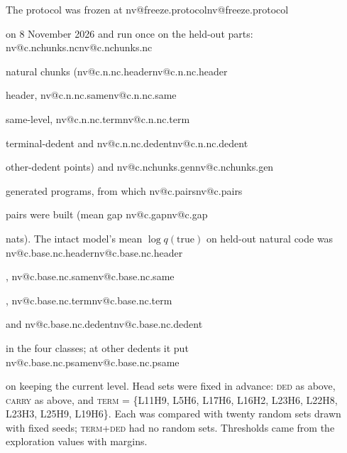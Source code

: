 \documentclass[11pt]{article}
\makeatletter
\newcommand{\nv}[1]{\ifcsname nv@#1\endcsname\csname nv@#1\endcsname\else\PackageError{numbers}{Unknown number key #1}{}\fi}
\newcommand{\hd}[2]{L#1H#2}
\newcommand{\ded}{\textsc{ded}}
\newcommand{\term}{\textsc{term}}
\newcommand{\carry}{\textsc{carry}}
\makeatother
\begin{document}
The protocol was frozen at \nv{freeze.protocol} on 8 November 2026 and run once on the held-out parts: \nv{c.nchunks.nc} natural chunks (\nv{c.n.nc.header} header, \nv{c.n.nc.same} same-level, \nv{c.n.nc.term} terminal-dedent and \nv{c.n.nc.dedent} other-dedent points) and \nv{c.nchunks.gen} generated programs, from which \nv{c.pairs} pairs were built (mean gap \nv{c.gap} nats). The intact model's mean $\log q(\text{true})$ on held-out natural code was \nv{c.base.nc.header}, \nv{c.base.nc.same}, \nv{c.base.nc.term} and \nv{c.base.nc.dedent} in the four classes; at other dedents it put \nv{c.base.nc.psame} on keeping the current level. Head sets were fixed in advance: \ded{} as above, \carry{} as above, and \term{} = \{\hd{11}{9}, \hd{5}{6}, \hd{17}{6}, \hd{16}{2}, \hd{23}{6}, \hd{22}{8}, \hd{23}{3}, \hd{25}{9}, \hd{19}{6}\}. Each was compared with twenty random sets drawn with fixed seeds; \textsc{term+ded} had no random sets. Thresholds came from the exploration values with margins.
\end{document}
